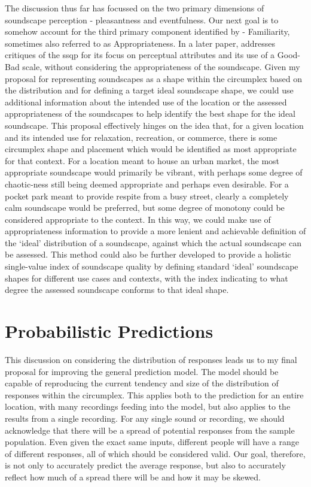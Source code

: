The discussion thus far has focussed on the two primary dimensions of soundscape perception - pleasantness and eventfulness. Our next goal is to somehow account for the third primary component identified by \citet{Axelsson2010principal} - Familiarity, sometimes also referred to as Appropriateness. In a later paper, \citet{Axelsson2015How} addresses critiques of the \gls{ssqp} for its focus on perceptual attributes and its use of a Good-Bad scale, without considering the appropriateness of the soundscape. Given my proposal for representing soundscapes as a shape within the circumplex based on the distribution and for defining a target ideal soundscape shape, we could use additional information about the intended use of the location or the assessed appropriateness of the soundscapes to help identify the best shape for the ideal soundscape. This proposal effectively hinges on the idea that, for a given location and its intended use for relaxation, recreation, or commerce, there is some circumplex shape and placement which would be identified as most appropriate for that context. For a location meant to house an urban market, the most appropriate soundscape would primarily be vibrant, with perhaps some degree of chaotic-ness still being deemed appropriate and perhaps even desirable. For a pocket park meant to provide respite from a busy street, clearly a completely calm soundscape would be preferred, but some degree of monotony could be considered appropriate to the context. In this way, we could make use of appropriateness information to provide a more lenient and achievable definition of the `ideal' distribution of a soundscape, against which the actual soundscape can be assessed. This method could also be further developed to provide a holistic single-value index of soundscape quality by defining standard `ideal' soundscape shapes for different use cases and contexts, with the index indicating to what degree the assessed soundscape conforms to that ideal shape.

\section{Probabilistic Predictions}

This discussion on considering the distribution of responses leads us to my final proposal for improving the general prediction model. The model should be capable of reproducing the current tendency and size of the distribution of responses within the circumplex. This applies both to the prediction for an entire location, with many recordings feeding into the model, but also applies to the results from a single recording. For any single sound or recording, we should acknowledge that there will be a spread of potential responses from the sample population. Even given the exact same inputs, different people will have a range of different responses, all of which should be considered valid. Our goal, therefore, is not only to accurately predict the average response, but also to accurately reflect how much of a spread there will be and how it may be skewed. 

